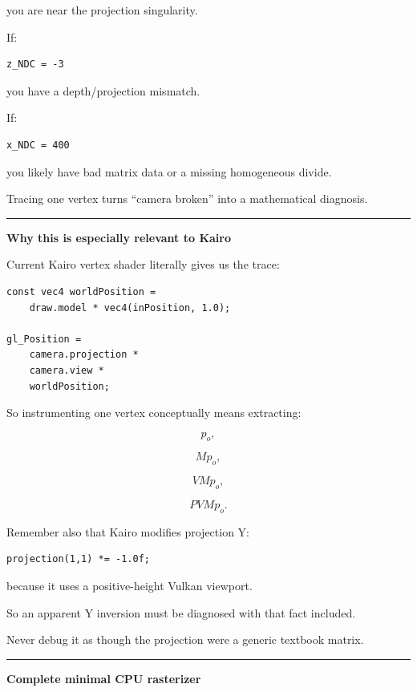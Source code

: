 you are near the projection singularity.

If:

\begin{verbatim}
z_NDC = -3
\end{verbatim}

you have a depth/projection mismatch.

If:

\begin{verbatim}
x_NDC = 400
\end{verbatim}

you likely have bad matrix data or a missing homogeneous divide.

Tracing one vertex turns ``camera broken'' into a mathematical diagnosis.

\begin{center}\rule{0.5\linewidth}{0.5pt}\end{center}

\textbf{Why this is especially relevant to Kairo}

Current Kairo vertex shader literally gives us the trace:

\begin{verbatim}
const vec4 worldPosition =
    draw.model * vec4(inPosition, 1.0);

gl_Position =
    camera.projection *
    camera.view *
    worldPosition;
\end{verbatim}

So instrumenting one vertex conceptually means extracting:

\[
p_o,
\]

\[
M p_o,
\]

\[
V M p_o,
\]

\[
PVMp_o.
\]

Remember also that Kairo modifies projection Y:

\begin{verbatim}
projection(1,1) *= -1.0f;
\end{verbatim}

because it uses a positive-height Vulkan viewport.

So an apparent Y inversion must be diagnosed with that fact included.

Never debug it as though the projection were a generic textbook matrix.

\begin{center}\rule{0.5\linewidth}{0.5pt}\end{center}

\textbf{Complete minimal CPU rasterizer}

